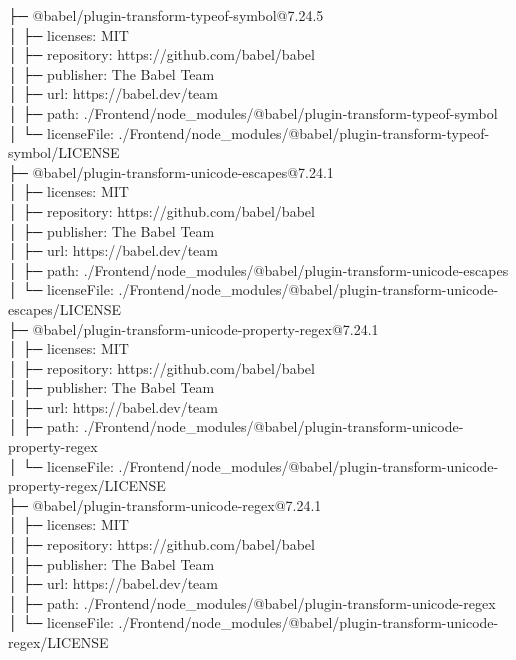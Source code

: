 ├─ @babel/plugin-transform-typeof-symbol@7.24.5\\
│  ├─ licenses: MIT\\
│  ├─ repository: https://github.com/babel/babel\\
│  ├─ publisher: The Babel Team\\
│  ├─ url: https://babel.dev/team\\
│  ├─ path: ./Frontend/node\_modules/@babel/plugin-transform-typeof-symbol\\
│  └─ licenseFile: ./Frontend/node\_modules/@babel/plugin-transform-typeof-symbol/LICENSE\\
├─ @babel/plugin-transform-unicode-escapes@7.24.1\\
│  ├─ licenses: MIT\\
│  ├─ repository: https://github.com/babel/babel\\
│  ├─ publisher: The Babel Team\\
│  ├─ url: https://babel.dev/team\\
│  ├─ path: ./Frontend/node\_modules/@babel/plugin-transform-unicode-escapes\\
│  └─ licenseFile: ./Frontend/node\_modules/@babel/plugin-transform-unicode-escapes/LICENSE\\
├─ @babel/plugin-transform-unicode-property-regex@7.24.1\\
│  ├─ licenses: MIT\\
│  ├─ repository: https://github.com/babel/babel\\
│  ├─ publisher: The Babel Team\\
│  ├─ url: https://babel.dev/team\\
│  ├─ path: ./Frontend/node\_modules/@babel/plugin-transform-unicode-property-regex\\
│  └─ licenseFile: ./Frontend/node\_modules/@babel/plugin-transform-unicode-property-regex/LICENSE\\
├─ @babel/plugin-transform-unicode-regex@7.24.1\\
│  ├─ licenses: MIT\\
│  ├─ repository: https://github.com/babel/babel\\
│  ├─ publisher: The Babel Team\\
│  ├─ url: https://babel.dev/team\\
│  ├─ path: ./Frontend/node\_modules/@babel/plugin-transform-unicode-regex\\
│  └─ licenseFile: ./Frontend/node\_modules/@babel/plugin-transform-unicode-regex/LICENSE\\
